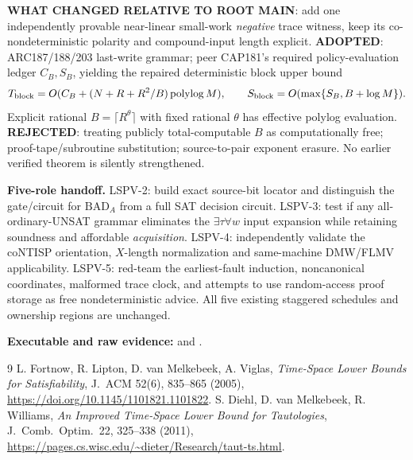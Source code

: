 \documentclass[11pt]{article}
\begin{document}
\noindent\textbf{WHAT CHANGED RELATIVE TO ROOT MAIN}: add one independently provable near-linear small-work \emph{negative} trace witness, keep its co-nondeterministic polarity and compound-input length explicit. \textbf{ADOPTED}: ARC187/188/203 last-write grammar; peer CAP181's required policy-evaluation ledger $C_B,S_B$, yielding the repaired deterministic block upper bound
\[
T_{\rm block}=O(C_B+(N+R+R^2/B)\operatorname{polylog}M),\qquad
S_{\rm block}=O(\max\{S_B,B+\log M\}).
\]
Explicit rational $B=\lceil R^\theta\rceil$ with fixed rational $\theta$ has effective polylog evaluation. \textbf{REJECTED}: treating publicly total-computable $B$ as computationally free; proof-tape/subroutine substitution; source-to-pair exponent erasure. No earlier verified theorem is silently strengthened.

\noindent\textbf{Five-role handoff.}
LSPV-2: build exact source-bit locator and distinguish the gate/circuit for $\mathrm{BAD}_A$ from a full SAT decision circuit.
LSPV-3: test if any all-ordinary-UNSAT grammar eliminates the $\exists\tau\forall w$ input expansion while retaining soundness and affordable \emph{acquisition}.
LSPV-4: independently validate the coNTISP orientation, $X$-length normalization and same-machine DMW/FLMV applicability.
LSPV-5: red-team the earliest-fault induction, noncanonical coordinates, malformed trace clock, and attempts to use random-access proof storage as free nondeterministic advice. All five existing staggered schedules and ownership regions are unchanged.

\noindent\textbf{Executable and raw evidence:}
 and
.

\begin{thebibliography}{9}
 L. Fortnow, R. Lipton, D. van Melkebeek, A. Viglas, \emph{Time-Space Lower Bounds for Satisfiability}, J.\ ACM 52(6), 835--865 (2005), \url{https://doi.org/10.1145/1101821.1101822}.
 S. Diehl, D. van Melkebeek, R. Williams, \emph{An Improved Time-Space Lower Bound for Tautologies}, J.\ Comb.\ Optim.\ 22, 325--338 (2011), \url{https://pages.cs.wisc.edu/~dieter/Research/taut-ts.html}.
\end{thebibliography}
\end{document}
